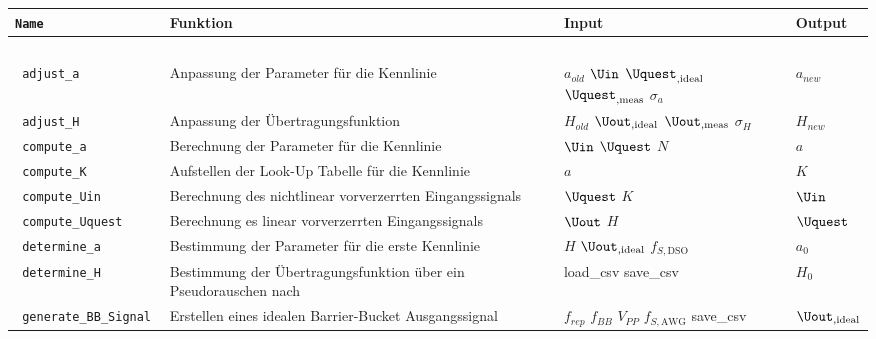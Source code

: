 \documentclass[../Report.tex]{subfiles}
\begin{document}
\begin{table}[H]
\centering 
\begin{tabular}[t]{| >{\texttt\bgroup}m{3.5cm}<{\egroup}|m{8cm}|m{2cm}|m{2cm}|} 
  \hline
    \textrm{\textbf{Name}} & \textbf{Funktion} & \textbf{Input} & \textbf{Output} \\ 
  \hline \hline
    \multicolumn{4}{|c|}{blocks} \\
  \hline \hline
  adjust\_a & Anpassung der Parameter für die Kennlinie & $a_{old}$ \newline $\Uin$ \newline $\Uquest_{,\textrm{ideal}}$ \newline $\Uquest_{,\textrm{meas}}$ \newline $\sigma_a$ & $a_{new}$\\
  \hline
  adjust\_H & Anpassung der Übertragungsfunktion & $H_{old}$ \newline $\Uout_{,\textrm{ideal}}$ \newline $\Uout_{,\textrm{meas}}$ \newline $\sigma_H$ & $H_{new}$\\
  \hline
  compute\_a & Berechnung der Parameter für die Kennlinie & $\Uin$ \newline $\Uquest$ \newline $N$ & $a$\\
  \hline
  compute\_K & Aufstellen der Look-Up Tabelle für die Kennlinie & $a$ & $K$\\
  \hline
  compute\_Uin & Berechnung des nichtlinear vorverzerrten Eingangssignals & $\Uquest$ \newline $K$ & $\Uin$\\
  \hline
  compute\_Uquest & Berechnung es linear vorverzerrten Eingangssignals & $\Uout$ \newline $H$ & $\Uquest$\\
  \hline
  determine\_a & Bestimmung der Parameter für die erste Kennlinie & $H$ \newline $\Uout_{,\textrm{ideal}}$ \newline $f_{S,\textrm{DSO}}$ & $a_0$\\
  \hline
  determine\_H & Bestimmung der Übertragungsfunktion über ein Pseudorauschen nach \cite{PJS_Denys} & load\_csv \newline save\_csv  & $H_0$\\
  \hline
  generate\_BB\_Signal & Erstellen eines idealen Barrier-Bucket Ausgangssignal & $f_{rep}$ \newline $f_{BB}$ \newline $V_{PP}$ \newline $f_{S,\textrm{AWG}}$ \newline save\_csv & $\Uout_{,\textrm{ideal}}$\\

\end{tabular}
\end{table}
\end{document}

